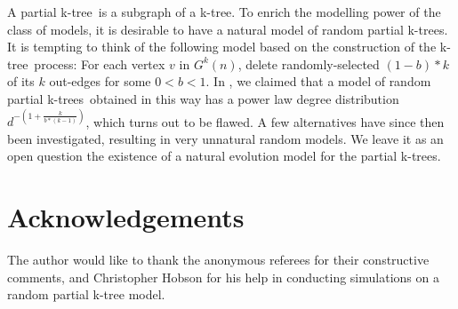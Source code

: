 \documentclass[11pt]{article}
\providecommand{\rktree}[2]{G^{#1}(#2)}
\providecommand{\ktree}{k-tree}
\providecommand{\ktrees}{k-trees}
\begin{document}
A partial \ktree\ is a subgraph of a \ktree. To enrich the modelling power of the class of models, it is desirable to have a natural model of
random partial \ktrees.  It is tempting to think of the following model based on the construction of the \ktree\ process:  For each vertex $v$ in
$\rktree{k}{n}$, delete randomly-selected $(1 - b) * k$ of its $k$ out-edges for some 
$0 < b < 1$. In \cite{gao06waw}, we claimed that a model of random partial \ktrees\ obtained in this way has
a power law degree distribution $d^{-(1 + \frac{k}{b*(k-1)})}$, which turns out to be flawed. A few alternatives have since then been
investigated, resulting in very unnatural random models. We leave it as an open question the existence of a natural evolution model for the partial \ktrees.



















































\section*{Acknowledgements} 
The author would like to thank the anonymous referees for their constructive comments, and 
Christopher Hobson for his help in conducting simulations on a random partial k-tree model.


\end{document}

